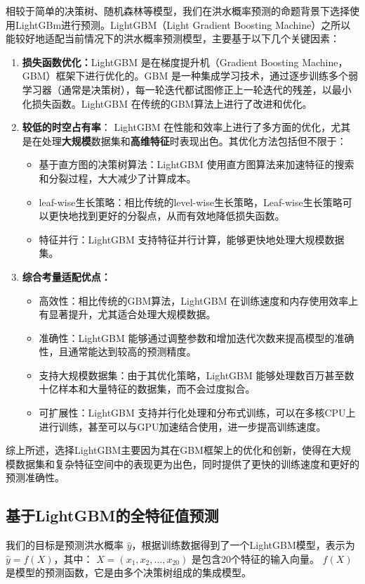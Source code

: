 \documentclass[withoutpreface,bwprint]{cumcmthesis} %
\begin{document}
相较于简单的决策树、随机森林等模型\cite{bib:seven}，我们在洪水概率预测的命题背景下选择使用LightGBm进行预测。LightGBM（Light Gradient Boosting Machine）之所以能较好地适配当前情况下的洪水概率预测模型，主要基于以下几个关键因素：
\begin{enumerate}
	\item \textbf{损失函数优化：}LightGBM 是在梯度提升机（Gradient Boosting Machine，GBM）框架下进行优化的。GBM 是一种集成学习技术，通过逐步训练多个弱学习器（通常是决策树），每一轮迭代都试图修正上一轮迭代的残差，以最小化损失函数。LightGBM 在传统的GBM算法上进行了改进和优化。\cite{bib:eight}
	
	\item \textbf{较低的时空占有率}：
	LightGBM 在性能和效率上进行了多方面的优化，尤其是在处理\textbf{大规模}数据集和\textbf{高维特征}时表现出色。其优化方法包括但不限于：
	\begin{itemize}
		\item 基于直方图的决策树算法：LightGBM 使用直方图算法来加速特征的搜索和分裂过程，大大减少了计算成本。
		\item leaf-wise生长策略：相比传统的level-wise生长策略，Leaf-wise生长策略可以更快地找到更好的分裂点，从而有效地降低损失函数。\cite{bib:eight}
		\item 特征并行：LightGBM 支持特征并行计算，能够更快地处理大规模数据集。
	\end{itemize}
	\item \textbf{综合考量适配优点：}
	\begin{itemize}
		\item 高效性：相比传统的GBM算法，LightGBM 在训练速度和内存使用效率上有显著提升，尤其适合处理大规模数据。
		\item 准确性：LightGBM 能够通过调整参数和增加迭代次数来提高模型的准确性，且通常能达到较高的预测精度。
		\item 支持大规模数据集：由于其优化策略，LightGBM 能够处理数百万甚至数十亿样本和大量特征的数据集，而不会过度拟合。\cite{bib:eight}
		\item 可扩展性：LightGBM 支持并行化处理和分布式训练，可以在多核CPU上进行训练，甚至可以与GPU加速结合使用，进一步提高训练速度。
	\end{itemize}
\end{enumerate}
综上所述，选择LightGBM主要因为其在GBM框架上的优化和创新，使得在大规模数据集和复杂特征空间中的表现更为出色，同时提供了更快的训练速度和更好的预测准确性。\cite{bib:seven}
\subsection{基于LightGBM的全特征值预测}
我们的目标是预测洪水概率 \( \hat{y} \)，根据训练数据得到了一个LightGBM模型，表示为 \( \hat{y} = f(X) \)，其中：
 \( X = (x_1, x_2, ..., x_{20}) \) 是包含20个特征的输入向量。
 \( f(X) \) 是模型的预测函数，它是由多个决策树组成的集成模型。
\end{document}
